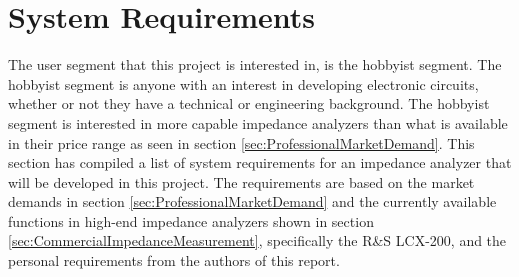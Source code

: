 \chapter{System Requirements} \label{ch:SystemRequirements}
The user segment that this project is interested in, is the hobbyist segment. The hobbyist segment is anyone with an interest in developing electronic circuits, whether or not they have a technical or engineering background. The hobbyist segment is interested in more capable impedance analyzers than what is available in their price range as seen in section \ref{sec:ProfessionalMarketDemand}. This section has compiled a list of system requirements for an impedance analyzer that will be developed in this project. The requirements are based on the market demands in section \ref{sec:ProfessionalMarketDemand} and the currently available functions in high-end impedance analyzers shown in section \ref{sec:CommercialImpedanceMeasurement}, specifically the R\&S LCX-200, and the personal requirements from the authors of this report. 

